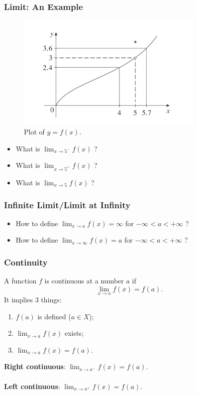\documentclass{beamer}
\begin{document}

\begin{frame}
\frametitle{Limit: An Example}
\begin{figure}[H]
\centering
\includegraphics[width=9cm]{Function-limit-eg.png}
\caption{Plot of $y=f(x)$.}
\end{figure}
\begin{itemize}
\item What is $\lim_{x\rightarrow 5^{-}}f(x)$ ?
\item What is $\lim_{x\rightarrow 5^{+}}f(x)$ ?
\item What is $\lim_{x\rightarrow 5}f(x)$ ?
\end{itemize}
\end{frame}

\begin{frame}
\frametitle{Infinite Limit/Limit at Infinity}
\begin{itemize}
\item How to define $\lim_{x \rightarrow a}f(x) = \infty$ for $-\infty < a < +\infty$ ?
\vspace*{1.5in}
\item How to define $\lim_{x \rightarrow \infty}f(x) = a$ for $-\infty < a < +\infty$ ?
\vspace*{1.5in}
\end{itemize}
\end{frame}

\begin{frame}
\frametitle{Continuity}
A function $f$ is continuous at a number $a$ if
$$
\lim_{x \rightarrow a} f(x) = f(a).
$$
It implies 3 things:
\begin{enumerate}
\item $f(a)$ is defined ($a \in X$);
\item $\lim_{x \rightarrow a} f(x)$ exists;
\item $\lim_{x \rightarrow a} f(x) = f(a)$.
\end{enumerate}
\vspace*{0.15in}
\textbf{Right continuous}: $\lim_{x \rightarrow a^{-}} f(x) = f(a)$.
\\~\\
\textbf{Left continuous}: $\lim_{x \rightarrow a^{+}} f(x) = f(a)$.

\end{frame}
\end{document}
